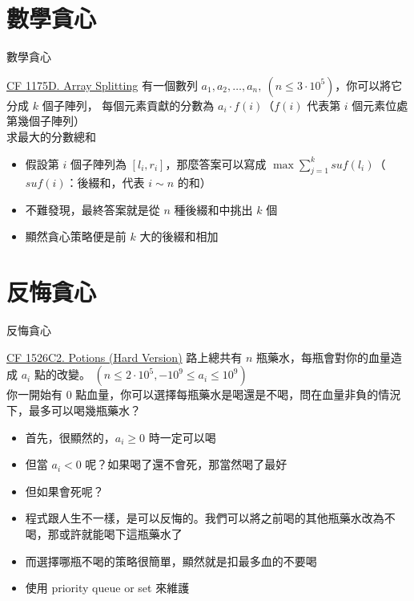 \documentclass[aspectratio=169]{beamer}
\begin{document}
    \section{數學貪心}
    
    \begin{frame}{數學貪心}
        \begin{block}{\href{https://codeforces.com/problemset/problem/1175/D}{CF 1175D. Array Splitting}}
            有一個數列 $a_1, a_2, \dots, a_n,\ (n \le 3 \cdot 10^5)$，你可以將它分成 $k$ 個子陣列，
            每個元素貢獻的分數為 $a_i \cdot f(i)$（$f(i)$ 代表第 $i$ 個元素位處第幾個子陣列）\\
            求最大的分數總和
        \end{block}

        \begin{itemize}
            \item<1-> 假設第 $i$ 個子陣列為 $[l_i, r_i]$，那麼答案可以寫成 $\max\sum_{j = 1}^{k}{suf(l_i)}$（$suf(i)$：後綴和，代表 $i \sim n$ 的和）
            \item<2-> 不難發現，最終答案就是從 $n$ 種後綴和中挑出 $k$ 個
            \item<3-> 顯然貪心策略便是前 $k$ 大的後綴和相加
        \end{itemize}
    \end{frame}

    \section{反悔貪心}

    \begin{frame}{反悔貪心}
        \begin{block}{\href{https://codeforces.com/problemset/problem/1526/C2}{CF 1526C2. Potions (Hard Version)}}
            路上總共有 $n$ 瓶藥水，每瓶會對你的血量造成 $a_i$ 點的改變。 $(n \le 2 \cdot 10^5, -10^9 \le a_i \le 10^9)$\\
            你一開始有 $0$ 點血量，你可以選擇每瓶藥水是喝還是不喝，問在血量非負的情況下，最多可以喝幾瓶藥水？
        \end{block}

        \begin{itemize}
            \item<1-> 首先，很顯然的，$a_i \ge 0$ 時一定可以喝
            \item<2-> 但當 $a_i < 0$ 呢？如果喝了還不會死，那當然喝了最好
            \item<3-> 但如果會死呢？
            \item<4-> 程式跟人生不一樣，是可以反悔的。我們可以將之前喝的其他瓶藥水改為不喝，那或許就能喝下這瓶藥水了
            \item<5-> 而選擇哪瓶不喝的策略很簡單，顯然就是扣最多血的不要喝
            \item<6-> 使用 priority queue or set 來維護
        \end{itemize}
    \end{frame}
\end{document}
